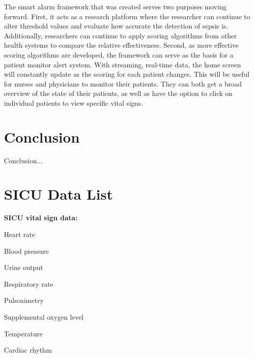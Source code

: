 \documentclass{sig-alternate}
\begin{document}
The smart alarm framework that was created serves two purposes moving forward.  First, it acts as a research platform where the researcher can continue to alter threshold values and evaluate how accurate the detection of sepsis is.  Additionally, researchers can continue to apply scoring algorithms from other health systems to compare the relative effectiveness.  Second, as more effective scoring algorithms are developed, the framework can serve as the basis for a patient monitor alert system.  With streaming, real-time data, the home screen will constantly update as the scoring for each patient changes.  This will be useful for nurses and physicians to monitor their patients.  They can both get a broad overview of the state of their patients, as well as have the option to click on individual patients to view specific vital signs.

\vspace{10pt}
\section{Conclusion}
\vspace{10pt}
\label{sec:conclusion}

Conclusion...





\vspace{10pt}

\vspace{10pt}
\appendix
\section{SICU Data List}
\label{app:sicu_data}

\noindent \textbf{SICU vital sign data:}
\begin{itemize*}
  \item Heart rate \vspace{3pt}
  \item Blood pressure \vspace{3pt}
  \item Urine output \vspace{3pt}
  \item Respiratory rate \vspace{3pt}
  \item Pulsoximetry \vspace{3pt}
  \item Supplemental oxygen level \vspace{3pt}
  \item Temperature \vspace{3pt}
  \item Cardiac rhythm \vspace{20pt}
\end{itemize*}
\end{document}
